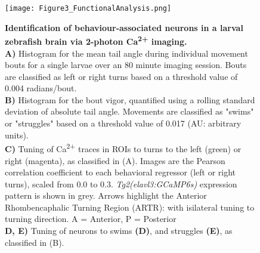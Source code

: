 \documentclass[9pt,lineno]{RandlettLab_elife}
\begin{document}
\begin{figure}
\begin{fullwidth}
\begin{center}

\texttt{[image: Figure3\_FunctionalAnalysis.png]}
\caption{\textbf{Identification of behaviour-associated neurons in a larval zebrafish brain via 2-photon Ca\textsuperscript{2+} imaging.}
\\ \textbf{A)} Histogram for the mean tail angle during individual movement bouts for a single larvae over an 80 minute imaging session. Bouts are classified as left or right turns based on a threshold value of 0.004 radians/bout. 
\\ \textbf{B)} Histogram for the bout vigor, quantified using a rolling standard deviation of absolute tail angle. Movements are classified as "swims" or "struggles" based on a threshold value of 0.017 (AU: arbitrary units).
\\ \textbf{C)} Tuning of Ca\textsuperscript{2+} traces in ROIs to turns to the left (green) or right (magenta), as classified in (A). Images are the Pearson correlation coefficient to each behavioral regressor (left or right turns), scaled from 0.0 to 0.3. \emph{Tg2(elavl3:GCaMP6s)} expression pattern is shown in grey. Arrows highlight the Anterior Rhombencaphalic Turning Region (ARTR): with isilateral tuning to turning direction. A = Anterior, P = Posterior
\\ \textbf{D, E)} Tuning of neurons to swims \textbf{(D)}, and struggles \textbf{(E)}, as classified in (B).  
}
\label{fig:3}

\end{center}
\end{fullwidth}
\end{figure}
\end{document}
